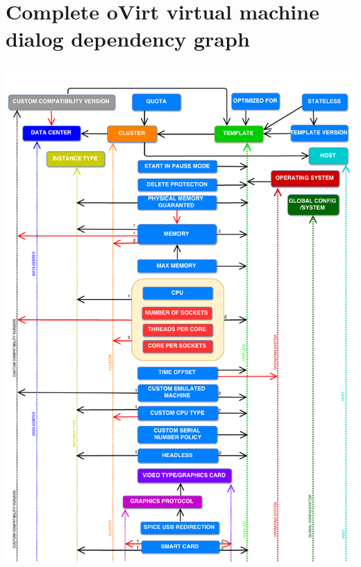 \chapter{Complete oVirt virtual machine dialog dependency graph} \label{graph}
\newpage
\includegraphics[page=1, width=1.00\textwidth, angle=0]{DependencyGraph}
\newpage
